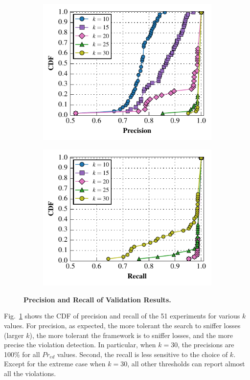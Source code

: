 \begin{figure}[t!]
  \centering
  \begin{subfigure}{0.48\textwidth}
    \includegraphics[width=\textwidth]{./figures/scripts/PrecisionFigure.pdf}
  \end{subfigure}
  \begin{subfigure}{0.48\textwidth}
    \includegraphics[width=\textwidth]{./figures/scripts/RecallFigure.pdf}
  \end{subfigure}
  \caption{\textbf{Precision and Recall of Validation Results.}}
  \label{fig:precision}
  \vspace*{-5mm}
\end{figure}

Fig.~\ref{fig:precision} shows the CDF of precision and recall of the 51
experiments for various $k$ values. For precision, as expected, the more
tolerant the search to sniffer losses (larger $k$), the more tolerant the
framework is to sniffer losses, and the more precise the violation detection. In
particular, when $k=30$, the precisions are 100\% for all $Pr_{ed}$ values.
Second, the recall is less sensitive to the choice of $k$.  Except for the
extreme case when $k=30$, all other thresholds can report almost all the
violations.
